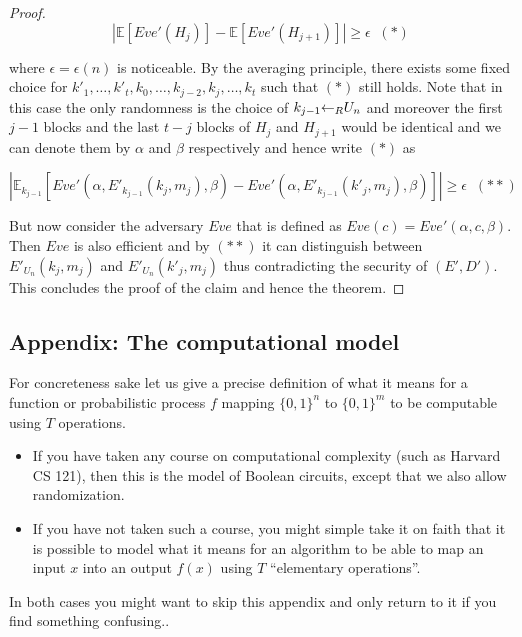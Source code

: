 \begin{proof}
\[
\left| {\mathbb{E}}[ Eve'(H_j)] - {\mathbb{E}}[ Eve'(H_{j+1})]\right|\geq \epsilon \;\;(*)
\]

where \(\epsilon = \epsilon(n)\) is noticeable. By the averaging
principle, there exists some fixed choice for
\(k'_1,\ldots,k'_t,k_0,\ldots,k_{j-2},k_j,\ldots,k_t\) such that \((*)\)
still holds. Note that in this case the only randomness is the choice of
\(k_{j-1}{\leftarrow_{\tiny R}}U_n\) and moreover the first \(j-1\)
blocks and the last \(t-j\) blocks of \(H_j\) and \(H_{j+1}\) would be
identical and we can denote them by \(\alpha\) and \(\beta\)
respectively and hence write \((*)\) as

\[
\left| {\mathbb{E}}_{k_{j-1}}[ Eve'(\alpha,E'_{k_{j-1}}(k_{j},m_j),\beta) - Eve'(\alpha,E'_{k_{j-1}}(k'_j,m_j),\beta) ] \right| \geq \epsilon \;\;(**)
\]

But now consider the adversary \(Eve\) that is defined as
\(Eve(c) = Eve'(\alpha,c,\beta)\). Then \(Eve\) is also efficient and by
\((**)\) it can distinguish between \(E'_{U_n}(k_j,m_j)\) and
\(E'_{U_n}(k'_j,m_j)\) thus contradicting the security of \((E',D')\).
This concludes the proof of the claim and hence the theorem.

\end{proof}

\subsection{Appendix: The computational
model}\label{Appendix-The-computationa}

For concreteness sake let us give a precise definition of what it means
for a function or probabilistic process \(f\) mapping \(\{0,1\}^n\) to
\(\{0,1\}^m\) to be computable using \(T\) operations.

\begin{itemize}
\item
  If you have taken any course on computational complexity (such as
  Harvard CS 121), then this is the model of Boolean circuits, except
  that we also allow randomization.
\item
  If you have not taken such a course, you might simple take it on faith
  that it is possible to model what it means for an algorithm to be able
  to map an input \(x\) into an output \(f(x)\) using \(T\) ``elementary
  operations''.
\end{itemize}

In both cases you might want to skip this appendix and only return to it
if you find something confusing..

